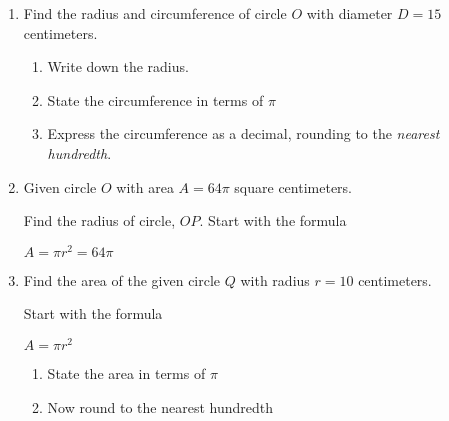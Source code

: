 \begin{enumerate}
\newpage
\item Find the radius and circumference of circle $O$ with diameter $D=15$ centimeters.
  \begin{multicols}{2}
  \raggedcolumns
  \begin{enumerate}
    \item Write down the radius. \vspace{1.2cm}
    \item State the circumference in terms of $\pi$ \vspace{1cm}
    \item Express the circumference as a decimal, rounding to the \emph{nearest hundredth}.
  \end{enumerate}
  \columnbreak
  \end{multicols}

\item Given circle $O$ with area $A=64 \pi$ square centimeters.
  \begin{multicols}{2}
  \raggedcolumns
  Find the radius of circle, $OP$. Start with the formula \par \smallskip
  $A = \pi r^2 = 64 \pi$ \vspace{1.7cm}
  \end{multicols}

\item Find the area of the given circle $Q$ with radius $r=10$ centimeters.
  \begin{multicols}{2}
  \raggedcolumns
  Start with the formula \par \medskip
  $A = \pi r^2$ 
  \begin{enumerate}
    \item State the area in terms of $\pi$ \vspace{1.7cm}
    \item Now round to the nearest hundredth
  \end{enumerate}
  \end{multicols}
  

\end{enumerate}
